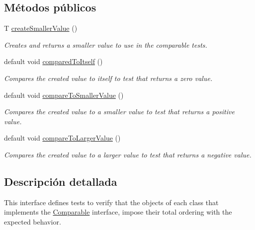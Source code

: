 \subsection*{Métodos públicos}
\begin{DoxyCompactItemize}
\item 
T \mbox{\hyperlink{interfacecom_1_1ruralhousejsf_1_1contract_1_1_comparable_contract_a63e1e8c46f202f132c7f15b51a11ee27}{create\+Smaller\+Value}} ()
\begin{DoxyCompactList}\small\item\em Creates and returns a smaller value to use in the comparable tests. \end{DoxyCompactList}\item 
default void \mbox{\hyperlink{interfacecom_1_1ruralhousejsf_1_1contract_1_1_comparable_contract_ad21966d20e5fffd0fa13cd021c262f11}{compared\+To\+Itself}} ()
\begin{DoxyCompactList}\small\item\em Compares the created value to itself to test that returns a zero value. \end{DoxyCompactList}\item 
default void \mbox{\hyperlink{interfacecom_1_1ruralhousejsf_1_1contract_1_1_comparable_contract_aa5df8ced74d7707d219de7d79eb04cb1}{compare\+To\+Smaller\+Value}} ()
\begin{DoxyCompactList}\small\item\em Compares the created value to a smaller value to test that returns a positive value. \end{DoxyCompactList}\item 
default void \mbox{\hyperlink{interfacecom_1_1ruralhousejsf_1_1contract_1_1_comparable_contract_aceb2f65e9d26e521c6dc0eb2cbe6a35d}{compare\+To\+Larger\+Value}} ()
\begin{DoxyCompactList}\small\item\em Compares the created value to a larger value to test that returns a negative value. \end{DoxyCompactList}\end{DoxyCompactItemize}


\subsection{Descripción detallada}
This interface defines tests to verify that the objects of each class that implements the \mbox{\hyperlink{}{Comparable}} interface, impose their total ordering with the expected behavior. 

